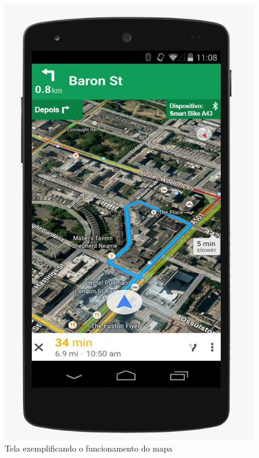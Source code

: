 	\graphicspath{{figuras/}}
	\begin{figure}[h!]
	\centering
	\includegraphics[scale=0.40]{mapa.jpeg}
	\caption{Tela exemplificando o funcionamento do mapa}
	\label{img:mapa}
	\end{figure}
	
